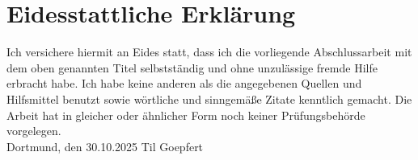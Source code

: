 \newpage
\thispagestyle{empty}
\section*{Eidesstattliche Erklärung}
\thispagestyle{empty}
Ich versichere hiermit an Eides statt, dass ich die vorliegende Abschlussarbeit mit dem oben genannten Titel selbstständig und ohne unzulässige fremde Hilfe erbracht habe. Ich habe keine anderen als die angegebenen Quellen und Hilfsmittel benutzt sowie wörtliche und sinngemäße Zitate kenntlich gemacht. Die Arbeit hat in gleicher oder ähnlicher Form noch keiner Prüfungsbehörde vorgelegen.
\vspace{4\baselineskip}\\
Dortmund, den 30.10.2025 \hfill Til Goepfert
\vspace{4\baselineskip}\\
